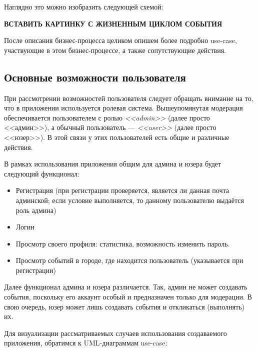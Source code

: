 \documentclass[diploma]{SCWorks}
\begin{document}
Наглядно это можно изобразить следующей схемой:

\begin{center}
    \textbf{ВСТАВИТЬ КАРТИНКУ С ЖИЗНЕННЫМ ЦИКЛОМ СОБЫТИЯ}
    \label{pic:event_lifetime}
\end{center}

После описания бизнес-процесса целиком опишем более подробно use-case, 
участвующие в этом бизнес-процессе, а также сопутствующие действия.

\subsection{Основные возможности пользователя}

При рассмотрении возможностей пользователя следует обращать внимание на то, что
в приложении используется ролевая система. Вышеупомянутая модерация 
обеспечивается пользователем с ролью \textit{<<admin>>} (далее просто 
<<админ>>), а обычный пользователь — \textit{<<user>>} (далее просто <<юзер>>). 
В этой связи у этих пользователей есть общие и различные действия.

В рамках использования приложения общим для админа и юзера будет следующий 
функционал:
\begin{itemize}
    \item Регистрация (при регистрации проверяется, является ли данная почта 
    админской; если условие выполняется, то данному пользователю выдаётся роль
    админа)
    \item Логин
    \item Просмотр своего профиля: статистика, возможность изменить пароль.
    \item Просмотр событий в городе, где находится пользователь (указывается 
    при регистрации)
\end{itemize}

Далее функционал админа и юзера различается. Так, админ не может создавать 
события, поскольку его аккаунт особый и предназначен только для модерации.
В свою очередь, юзер может лишь создавать события и откликаться (выполнять) их.

Для визуализации рассматриваемых случаев использования создаваемого приложения, 
обратимся к UML-диаграммам use-case:
\end{document}
